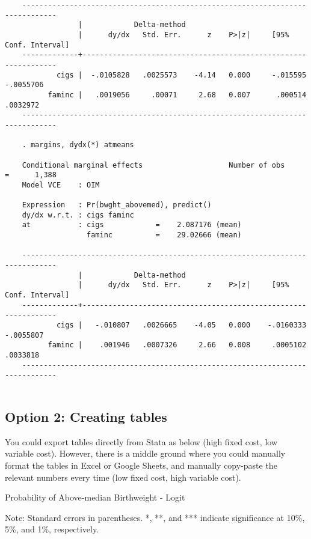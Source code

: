 \documentclass[letterpaper]{article}
\begin{document}
\begin{spacing}{1.2}
\begin{verbatim}
	------------------------------------------------------------------------------
	             |            Delta-method
	             |      dy/dx   Std. Err.      z    P>|z|     [95% Conf. Interval]
	-------------+----------------------------------------------------------------
	        cigs |  -.0105828   .0025573    -4.14   0.000     -.015595   -.0055706
	      faminc |   .0019056     .00071     2.68   0.007      .000514    .0032972
	------------------------------------------------------------------------------

	. margins, dydx(*) atmeans                    

	Conditional marginal effects                    Number of obs     =      1,388
	Model VCE    : OIM

	Expression   : Pr(bwght_abovemed), predict()
	dy/dx w.r.t. : cigs faminc
	at           : cigs            =    2.087176 (mean)
	               faminc          =    29.02666 (mean)

	------------------------------------------------------------------------------
	             |            Delta-method
	             |      dy/dx   Std. Err.      z    P>|z|     [95% Conf. Interval]
	-------------+----------------------------------------------------------------
	        cigs |   -.010807   .0026665    -4.05   0.000    -.0160333   -.0055807
	      faminc |    .001946   .0007326     2.66   0.008     .0005102    .0033818
	------------------------------------------------------------------------------


	\end{verbatim}

\subsection*{Option 2: Creating tables}

You could export tables directly from Stata as below (high fixed cost, low variable cost). However, there is a middle ground where you could manually format the tables in Excel or Google Sheets, and manually copy-paste the relevant numbers every time (low fixed cost, high variable cost). 

	\begin{table}[H] 
	\caption{Probability of Above-median Birthweight  - Logit}
	\centering
	\renewcommand\arraystretch{1.25}        
	\begin{threeparttable}
	\footnotesize
	
	    \begin{tablenotes}
	    \footnotesize 
        Note: Standard errors in parentheses. *, **, and *** indicate significance at 10\%, 5\%, and 1\%, respectively. \\
	    \end{tablenotes}
	\end{threeparttable}
	\end{table}


\end{spacing}
\end{document}
